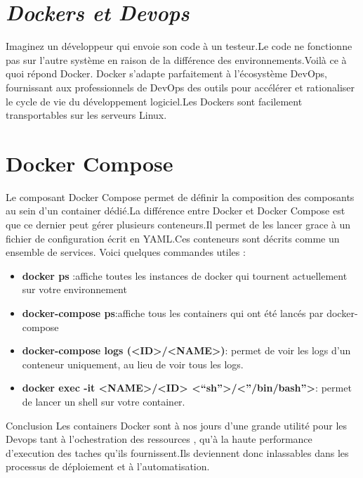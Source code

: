 \section*{\textit{Dockers et Devops}}
\vspace{0.5cm}
Imaginez un développeur qui envoie son code à un testeur.Le code ne fonctionne pas sur l'autre système en raison de la différence des environnements.Voilà ce à quoi répond Docker.
\vspace{0.5cm}
Docker s'adapte parfaitement à l'écosystème DevOps, fournissant aux professionnels de DevOps des outils pour accélérer et rationaliser le cycle de vie du développement logiciel.Les Dockers sont facilement transportables sur les serveurs Linux.
\section*{Docker Compose}
Le composant Docker Compose permet de définir la composition des composants au sein d’un container dédié.La différence entre Docker et Docker Compose est que ce dernier peut gérer plusieurs conteneurs.Il permet de les lancer grace à un fichier de configuration écrit en YAML.Ces conteneurs sont décrits comme un ensemble de services.
Voici quelques commandes utiles :
\begin{itemize}
	\item \textbf{docker ps }:affiche toutes les instances de docker qui tournent actuellement sur votre environnement
	\item \textbf{docker-compose ps}:affiche tous les containers qui ont été lancés par docker-compose
	\item \textbf{docker-compose logs (<ID>/<NAME>)}: permet de voir les logs d’un conteneur uniquement, au lieu de voir tous les logs.
	\item \textbf{docker exec -it <NAME>/<ID> <“sh”>/<”/bin/bash”>}: permet de lancer un shell sur votre container.
\end{itemize}

Conclusion
Les containers Docker sont à nos jours d'une grande utilité pour les Devops tant à l'ochestration des ressources , qu'à la haute performance d'execution des taches qu'ils fournissent.Ils deviennent donc inlassables dans les processus de déploiement et à l'automatisation. 
